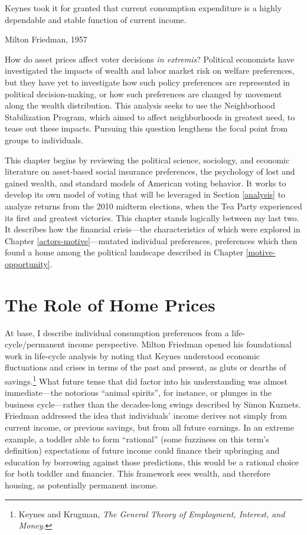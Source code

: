 \documentclass[12pt,oneside]{psthesis}
\begin{document}
\epigraph{Keynes took it for granted that current consumption expenditure is a highly dependable and stable function of current income.}{Milton Friedman, 1957}

How do asset prices affect voter decisions \emph{in extremis}?
Political economists have investigated the impacts of wealth and labor market risk on welfare preferences, but they have yet to investigate how such policy preferences are represented in political decision-making, or how such preferences are changed by movement along the wealth distribution.
This analysis seeks to use the Neighborhood Stabilization Program, which aimed to affect neighborhoods in greatest need, to tease out these impacts.
Pursuing this question lengthens the focal point from groups to individuals.

This chapter begins by reviewing the political science, sociology, and economic literature on asset-based social insurance preferences, the psychology of lost and gained wealth, and standard models of American voting behavior.
It works to develop its own model of voting that will be leveraged in Section \ref{analysis} to analyze returns from the 2010 midterm elections, when the Tea Party experienced its first and greatest victories.
This chapter stands logically between my last two.
It describes how the financial crisis---the characteristics of which were explored in Chapter \ref{actors-motive}---mutated individual preferences, preferences which then found a home among the political landscape described in Chapter \ref{motive-opportunity}.

\hypertarget{home-prices}{%
\section{The Role of Home Prices}\label{home-prices}}

At base, I describe individual consumption preferences from a life-cycle/permanent income perspective.
Milton Friedman opened his foundational work in life-cycle analysis by noting that Keynes understood economic fluctuations and crises in terms of the past and present, as gluts or dearths of savings.\footnote{Keynes and Krugman, \emph{The General Theory of Employment, Interest, and Money}.}
What future tense that did factor into his understanding was almost immediate---the notorious ``animal spirits'', for instance, or plunges in the business cycle---rather than the decades-long swings described by Simon Kuznets.
Friedman addressed the idea that individuals' income derives not simply from current income, or previous savings, but from all future earnings.
In an extreme example, a toddler able to form ``rational'' (some fuzziness on this term's definition) expectations of future income could finance their upbringing and education by borrowing against those predictions, this would be a rational choice for both toddler and financier.
This framework sees wealth, and therefore housing, as potentially permanent income.
\end{document}
